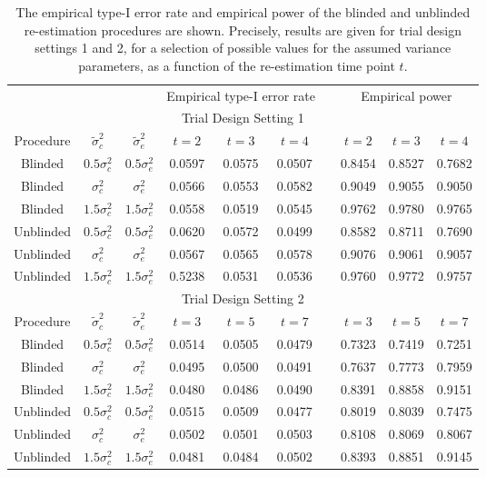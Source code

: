 \documentclass{article}
\begin{document}
\begin{table}[htb]
	\begin{center}
		\caption{The empirical type-I error rate and empirical power of the blinded and unblinded re-estimation procedures are shown. Precisely, results are given for trial design settings 1 and 2, for a selection of possible values for the assumed variance parameters, as a function of the re-estimation time point $t$.}
		\begin{tabular}{cccccccccc}
			\hline
			& & & \multicolumn{3}{c}{Empirical type-I error rate} && \multicolumn{3}{c}{Empirical power} \\
			\cline{4-6}\cline{8-10}
			\multicolumn{10}{c}{Trial Design Setting 1}\\
			\hline
			Procedure & $\tilde{\sigma}_c^2$ & $\tilde{\sigma}_e^2$ & $t=2$ & $t=3$ & $t=4$ && $t=2$ & $t=3$ & $t=4$\\
			\hline
			Blinded & $0.5\sigma_c^2$ & $0.5\sigma_e^2$ & 0.0597 & 0.0575 & 0.0507 && 0.8454 & 0.8527 & 0.7682 \\
			Blinded & $\sigma_c^2$ & $\sigma_e^2$ & 0.0566 & 0.0553 & 0.0582 && 0.9049 & 0.9055 & 0.9050 \\
			Blinded & $1.5\sigma_c^2$ & $1.5\sigma_e^2$ & 0.0558 & 0.0519 & 0.0545 && 0.9762 & 0.9780 & 0.9765 \\
			Unblinded & $0.5\sigma_c^2$ & $0.5\sigma_e^2$ & 0.0620 & 0.0572 & 0.0499 && 0.8582 & 0.8711 & 0.7690 \\
			Unblinded & $\sigma_c^2$ & $\sigma_e^2$ & 0.0567 & 0.0565 & 0.0578 && 0.9076 & 0.9061 & 0.9057 \\
			Unblinded & $1.5\sigma_c^2$ & $1.5\sigma_e^2$ & 0.5238 & 0.0531 & 0.0536 && 0.9760 & 0.9772 & 0.9757 \\
			\hline
			\multicolumn{10}{c}{Trial Design Setting 2}\\
			\hline
			Procedure & $\tilde{\sigma}_c^2$ & $\tilde{\sigma}_e^2$ & $t=3$ & $t=5$ & $t=7$ && $t=3$ & $t=5$ & $t=7$\\
			\hline
			Blinded & $0.5\sigma_c^2$ & $0.5\sigma_e^2$ & 0.0514 & 0.0505 & 0.0479 && 0.7323 & 0.7419 & 0.7251 \\
			Blinded & $\sigma_c^2$ & $\sigma_e^2$ & 0.0495 & 0.0500 & 0.0491 && 0.7637 & 0.7773 & 0.7959 \\
			Blinded & $1.5\sigma_c^2$ & $1.5\sigma_e^2$ & 0.0480 & 0.0486 & 0.0490 && 0.8391 & 0.8858 & 0.9151 \\
			Unblinded & $0.5\sigma_c^2$ & $0.5\sigma_e^2$ & 0.0515 & 0.0509 & 0.0477 && 0.8019 & 0.8039 & 0.7475 \\
			Unblinded & $\sigma_c^2$ & $\sigma_e^2$ & 0.0502 & 0.0501 & 0.0503 && 0.8108 & 0.8069 & 0.8067 \\
			Unblinded & $1.5\sigma_c^2$ & $1.5\sigma_e^2$ & 0.0481 & 0.0484 & 0.0502 && 0.8393 & 0.8851 & 0.9145 \\
			\hline
		\end{tabular}
	\end{center}
\end{table}
\end{document}
